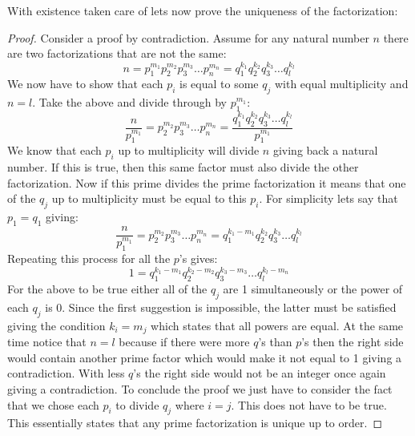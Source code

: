 \documentclass[12pt, letterpaper, onecolumn, conference, final]{IEEEtran}
\theoremstyle{definition}
\theoremstyle{plain}
\begin{document}
\noindent
With existence taken care of lets now prove the uniqueness of the factorization:
\begin{proof}
Consider a proof by contradiction. Assume for any natural number $n$ there are two factorizations that are not the same:
\begin{equation*}
n = p_1^{m_1} p_2^{m_2} p_3^{m_3} \dots p_n^{m_n} = q_1^{k_1} q_2^{k_2} q_3^{k_3} \dots q_l^{k_l}
\end{equation*}
We now have to show that each $p_i$ is equal to some $q_j$ with equal multiplicity and $n = l$. Take the above and divide through by $p_1^{m_1}$:
\begin{equation*}
\frac{n}{p_1^{m_1}} = p_2^{m_2} p_3^{m_3} \dots p_n^{m_n} = \frac{q_1^{k_1} q_2^{k_2} q_3^{k_3} \dots q_l^{k_l}}{p_1^{m_1}}
\end{equation*}
We know that each $p_i$ up to multiplicity will divide $n$ giving back a natural number. If this is true, then this same factor must also divide the other factorization. Now if this prime divides the prime factorization it means that one of the $q_j$ up to multiplicity must be equal to this $p_i$. For simplicity lets say that $p_1 = q_1$ giving:
\begin{equation*}
\frac{n}{p_1^{m_1}} = p_2^{m_2} p_3^{m_3} \dots p_n^{m_n} = q_1^{k_1-m_1} q_2^{k_2} q_3^{k_3} \dots q_l^{k_l}
\end{equation*}
Repeating this process for all the $p$'s gives:
\begin{equation*}
1 = q_1^{k_1-m_1} q_2^{k_2-m_2} q_3^{k_3-m_3} \dots q_l^{k_l-m_n}
\end{equation*}
For the above to be true either all of the $q_j$ are 1 simultaneously or the power of each $q_j$ is 0. Since the first suggestion is impossible, the latter must be satisfied giving the condition $k_i = m_j$ which states that all powers are equal. At the same time notice that $n = l$ because if there were more $q$'s than $p$'s then the right side would contain another prime factor which would make it not equal to 1 giving a contradiction. With less $q$'s the right side would not be an integer once again giving a contradiction. To conclude the proof we just have to consider the fact that we chose each $p_i$ to divide $q_j$ where $i = j$. This does not have to be true. This essentially states that any prime factorization is unique up to order.
\end{proof}
\end{document}
